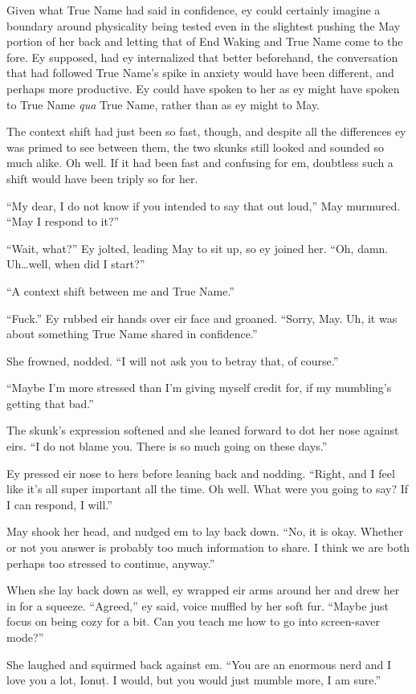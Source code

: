 Given what True Name had said in confidence, ey could certainly imagine a boundary around physicality being tested even in the slightest pushing the May portion of her back and letting that of End Waking and True Name come to the fore. Ey supposed, had ey internalized that better beforehand, the conversation that had followed True Name's spike in anxiety would have been different, and perhaps more productive. Ey could have spoken to her as ey might have spoken to True Name \emph{qua} True Name, rather than as ey might to May.

The context shift had just been so fast, though, and despite all the differences ey was primed to see between them, the two skunks still looked and sounded so much alike. Oh well. If it had been fast and confusing for em, doubtless such a shift would have been triply so for her.

``My dear, I do not know if you intended to say that out loud,'' May murmured. ``May I respond to it?''

``Wait, what?'' Ey jolted, leading May to sit up, so ey joined her. ``Oh, damn. Uh\ldots well, when did I start?''

``A context shift between me and True Name.''

``Fuck.'' Ey rubbed eir hands over eir face and groaned. ``Sorry, May. Uh, it was about something True Name shared in confidence.''

She frowned, nodded. ``I will not ask you to betray that, of course.''

``Maybe I'm more stressed than I'm giving myself credit for, if my mumbling's getting that bad.''

The skunk's expression softened and she leaned forward to dot her nose against eirs. ``I do not blame you. There is so much going on these days.''

Ey pressed eir nose to hers before leaning back and nodding. ``Right, and I feel like it's all super important all the time. Oh well. What were you going to say? If I can respond, I will.''

May shook her head, and nudged em to lay back down. ``No, it is okay. Whether or not you answer is probably too much information to share. I think we are both perhaps too stressed to continue, anyway.''

When she lay back down as well, ey wrapped eir arms around her and drew her in for a squeeze. ``Agreed,'' ey said, voice muffled by her soft fur. ``Maybe just focus on being cozy for a bit. Can you teach me how to go into screen-saver mode?''

She laughed and squirmed back against em. ``You are an enormous nerd and I love you a lot, Ionuț. I would, but you would just mumble more, I am sure.''
